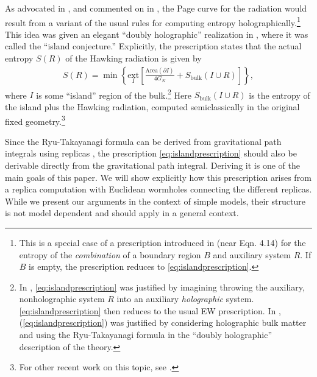 \documentclass[12pt]{article}
\numberwithin{equation}{section}
\begin{document}
As advocated in \cite{Penington:2019npb}, and commented on in \cite{Almheiri:2019psf}, the Page curve for the radiation would result from a variant of the usual rules for computing entropy holographically.\footnote{This is a special case of a prescription introduced in \cite{Hayden:2018khn} (near Eqn. 4.14) for the entropy of the \emph{combination} of a boundary region $B$ and auxiliary system $R$. If $B$ is empty, the prescription reduces to \eqref{eq:islandprescription}.} This idea was given an elegant ``doubly holographic'' realization in \cite{Almheiri:2019hni}, where it was called the ``island conjecture.''  Explicitly, the prescription states that the actual entropy $S(R)$ of the Hawking radiation is given by
\begin{align} \label{eq:islandprescription}
S(R) = \min \left\{\underset{I}{\text{ext}} \left[\frac{\text{Area}(\partial I)}{4 G_N} + S_\text{bulk}(I \cup R)\right]\right\},
\end{align}
where $I$ is some ``island'' region of the bulk.\footnote{In \cite{Hayden:2018khn,Penington:2019npb}, \eqref{eq:islandprescription} was justified by imagining throwing the auxiliary, nonholographic system $R$ into an auxiliary \emph{holographic} system. \eqref{eq:islandprescription} then reduces to the usual EW prescription. In \cite{Almheiri:2019hni}, (\ref{eq:islandprescription}) was justified by considering holographic bulk matter and using the Ryu-Takayanagi formula in the ``doubly holographic'' description of the theory.} Here $S_\text{bulk}(I\cup R)$ is the entropy of the island plus the Hawking radiation, computed semiclassically in the original fixed geometry.\footnote{For other recent work on this topic, see \cite{Akers:2019nfi,Almheiri:2019yqk,Rozali:2019day,Chen:2019uhq,Bousso:2019ykv,Almheiri:2019psy}.} %


Since the Ryu-Takayanagi formula can be derived from gravitational path integrals using replicas \cite{Lewkowycz:2013nqa,Faulkner:2013ana,Dong:2016hjy,Dong:2017xht}, the prescription \eqref{eq:islandprescription} should also be derivable directly from the gravitational path integral. Deriving it is one of the main goals of this paper. We will show explicitly how this prescription arises from a replica computation with Euclidean wormholes connecting the different replicas.   While we present our arguments in the context of simple models, their structure is not model dependent and should apply in a general context.
\end{document}
